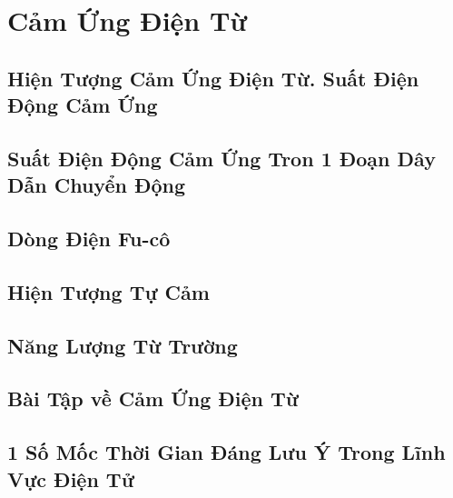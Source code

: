\documentclass[oneside]{book}
\numberwithin{equation}{section}
\begin{document}
\chapter{Cảm Ứng Điện Từ}

\section{Hiện Tượng Cảm Ứng Điện Từ. Suất Điện Động Cảm Ứng}


\section{Suất Điện Động Cảm Ứng Tron 1 Đoạn Dây Dẫn Chuyển Động}


\section{Dòng Điện Fu-cô}


\section{Hiện Tượng Tự Cảm}


\section{Năng Lượng Từ Trường}


\section{Bài Tập về Cảm Ứng Điện Từ}


\section{1 Số Mốc Thời Gian Đáng Lưu Ý Trong Lĩnh Vực Điện Tử}
\end{document}
